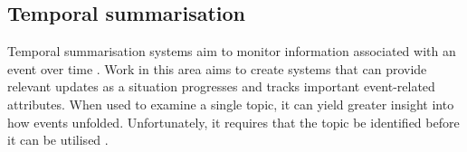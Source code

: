 \documentclass[12pt]{article}
\begin{document}
\subsection{Temporal summarisation}
Temporal summarisation systems aim to monitor information associated with an event over time \cite{trects2014}. Work in this area aims to create systems that can provide relevant updates as a situation progresses and tracks important event-related attributes. When used to examine a single topic, it can yield greater insight into how events unfolded. Unfortunately, it requires that the topic be identified before it can be utilised \cite{temporalsum}.


\newpage



\end{document}

